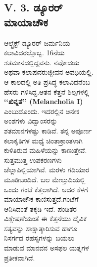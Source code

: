 \begin{figure}[H]
\begin{figure}[H]
\begin{figure}[H]
\begin{figure}[H]
\subsection*{V. 3. ಡ್ಯೂರರ್ ಮಾಯಾಚೌಕ}

ಆಲ್ಬ್ರೆಕ್ಟ್ ಡ್ಯೂರರ್ ಜರ್ಮನಿಯ ಕಲಾವಿದರಲ್ಲೊಬ್ಬ. 16ನೆಯ ಶತಮಾನದಲ್ಲಿದ್ದವನು. ನವೋದಯ ಅಥವಾ ಕಲಾಪುನರುಜ್ಜೀವನ ಅವಧಿಯಲ್ಲಿ. ಆ ಕಾಲದಲ್ಲಿ ಅತಿ ಪ್ರಸಿದ್ಧ ಕಲಾವಿದನೆಂಬ ಹೆಸರು ಗಳಿಸಿದ್ದ.ಆತನ ಕೆತ್ತನೆ ಶಿಲ್ಪಗಳಲ್ಲಿ \textbf{‘‘ಖಿನ್ನತೆ’’ (Melancholia I)} ಎಂಬುದೊಂದು. ಇದರಲ್ಲಿನ ಅನೇಕ ಅಂಶಗಳು ವಿದ್ವಾಂಸರನ್ನು ಶತಮಾನಗಳಷ್ಟು ಕಾಡಿವೆ. ತನ್ನ ಅಪೂರ್ಣ ಕಲಾಕೃತಿಗಳ ಮಧ್ಯೆ ಚಿಂತಾಕ್ರಾಂತಳಾಗಿ ಕುಳಿತಿರುವ ಮಹಿಳೆಯನ್ನು ಕಾಣುತ್ತೇವೆ. ಸುತ್ತಮುತ್ತ ಉಪಕರಣಗಳು ಚೆಲ್ಲಾಪಿಲ್ಲಿಯಾಗಿವೆ. ಮರಳು ಗಡಿಯಾರ ಮೂಡಿಬಂದಿದೆ. ಬಲ ಮೇಲ್ತುದಿಯಲ್ಲಿ ಒಂದು ಗಂಟೆ ಕೆತ್ತಲಾಗಿದೆ. ಅದರ ಕೆಳಗೆ ಮಾಯಾಚೌಕ ಕಾಣಿಸುತ್ತದೆ.\break ಗಂಟೆಗೆ ಆನಿಸಿದಂತೆ ತಕ್ಕಡಿ ಇದೆ. ಪಂಡಿತರ ವಿಶ್ಲೇಷಣೆಯಂತೆ ಈ ಕೆತ್ತನೆಯು ದೈವಿಕ ಸತ್ಯವನ್ನು ಸಾಕ್ಷಾತ್ಕಾರಿಸುವ ಹಾಗೂ ನಿಸರ್ಗದ ರಹಸ್ಯಗಳನ್ನು ಬಯಲು ಮಾಡುವ ಮಾನವನ ಅಸಫಲ ಯತ್ನಗಳ ಪ್ರತೀಕವಾಗಿದೆ.


\end{figure}
\end{figure}
\end{figure}
\end{figure}
